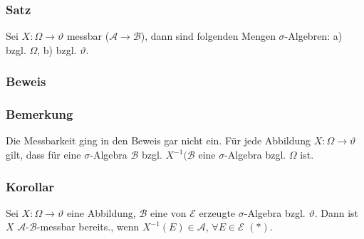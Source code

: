 \subsubsection{Satz}
Sei $X\colon\Omega\to\vartheta$ messbar ($\mathcal{A}\to\mathcal{B}$), dann sind folgenden Mengen $\sigma$-Algebren:
a) bzgl. $\Omega$, b) bzgl. $\vartheta$.
\subsubsection{Beweis}
\subsubsection{Bemerkung}
Die Messbarkeit ging in den Beweis gar nicht ein. F\"ur jede Abbildung $X\colon\Omega\to\vartheta$ gilt, dass f\"ur eine $\sigma$-Algebra $\mathcal{B}$ bzgl. $X^{-1}(\mathcal{B}$ eine $\sigma$-Algebra bzgl. $\Omega$ ist.
\subsubsection{Korollar}
Sei $X\colon\Omega\to\vartheta$ eine Abbildung, $\mathcal{B}$ eine von $\mathcal{E}$ erzeugte $\sigma$-Algebra bzgl. $\vartheta$. Dann ist $X$ $\mathcal{A}$-$\mathcal{B}$-messbar bereits., wenn $X^{-1}(E)\in\mathcal{A}$, $\forall E\in\mathcal{E}$ $(*)$.
